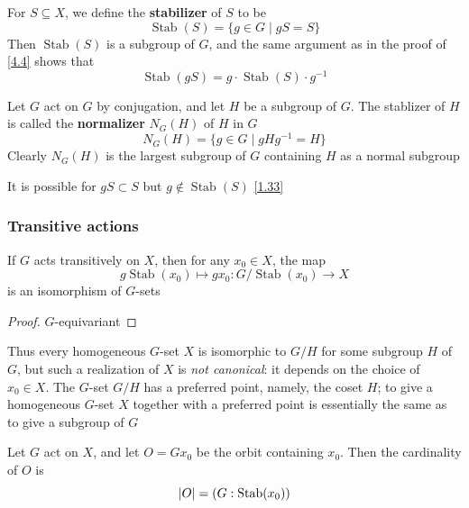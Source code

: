 \documentclass[11pt]{article}
\DeclareMathOperator{\Stab}{Stab}
\begin{document}
For \(S\subseteq X\), we define the \textbf{stabilizer} of \(S\) to be
\begin{equation*}
\Stab(S)=\{g\in G\mid gS=S\}
\end{equation*}
Then \(\Stab(S)\) is a subgroup of \(G\), and the same argument as in the proof of \ref{4.4}
shows that
\begin{equation*}
\Stab(gS)=g\cdot\Stab(S)\cdot g^{-1}
\end{equation*}

\begin{examplle}[]
Let \(G\) act on \(G\) by conjugation, and let \(H\) be a subgroup of \(G\). The stablizer
of \(H\) is called the \textbf{normalizer} \(N_G(H)\) of \(H\) in \(G\)
\begin{equation*}
N_G(H)=\{g\in G\mid gHg^{-1}=H\}
\end{equation*}
Clearly \(N_G(H)\) is the largest subgroup of \(G\) containing \(H\) as a normal subgroup
\end{examplle}
It is possible for \(gS\subset S\) but \(g\notin\Stab(S)\) \ref{1.33}

\subsubsection{Transitive actions}
\label{sec:orga55783d}
\begin{proposition}[]
If \(G\) acts transitively on \(X\), then for any \(x_0\in X\), the map
\begin{equation*}
g\Stab(x_0)\mapsto gx_0:G/\Stab(x_0)\to X
\end{equation*}
is an isomorphism of \(G\)-sets
\end{proposition}

\begin{proof}
\(G\)-equivariant
\end{proof}

Thus every homogeneous \(G\)-set \(X\) is isomorphic to \(G/H\) for some subgroup \(H\)
of \(G\), but such a realization of \(X\) is \emph{not canonical}: it depends on the choice
of \(x_0\in X\). The \(G\)-set \(G/H\) has a preferred point, namely, the coset \(H\); to give a
homogeneous \(G\)-set \(X\) together with a preferred point is essentially the same as to give a
subgroup of \(G\)

\begin{corollary}[]
Let \(G\) act on \(X\), and let \(O=Gx_0\) be the orbit containing \(x_0\). Then the cardinality
of \(O\) is
\begin{equation*}
\abs{O}=(G:\Stab(x_0))
\end{equation*}
\end{corollary}
\end{document}
